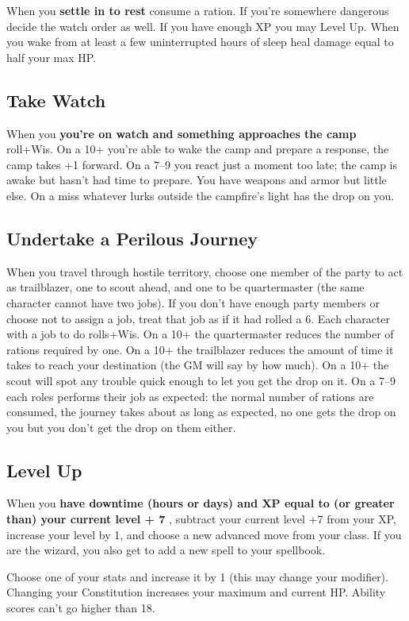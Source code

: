  When you \textbf{settle in to rest}
 consume a ration. If you're somewhere dangerous decide the watch order as well. If you have enough XP you may Level Up. When you wake from at least a few uninterrupted hours of sleep heal damage equal to half your max HP.
\subsection{Take Watch}


 When you \textbf{you're on watch and something approaches the camp}
 roll+Wis. On a 10+ you're able to wake the camp and prepare a response, the camp takes +1 forward. On a 7--9 you react just a moment too late; the camp is awake but hasn't had time to prepare. You have weapons and armor but little else. On a miss whatever lurks outside the campfire's light has the drop on you.
\subsection{Undertake a Perilous Journey}


 When you travel through hostile territory, choose one member of the party to act as trailblazer, one to scout ahead, and one to be quartermaster (the same character cannot have two jobs). If you don't have enough party members or choose not to assign a job, treat that job as if it had rolled a 6. Each character with a job to do rolls+Wis. On a 10+ the quartermaster reduces the number of rations required by one. On a 10+ the trailblazer reduces the amount of time it takes to reach your destination (the GM will say by how much). On a 10+ the scout will spot any trouble quick enough to let you get the drop on it. On a 7--9 each roles performs their job as expected: the normal number of rations are consumed, the journey takes about as long as expected, no one gets the drop on you but you don't get the drop on them either.
\subsection{Level Up}


 When you \textbf{have downtime (hours or days) and XP equal to (or greater than) your current level + 7}
, subtract your current level +7 from your XP, increase your level by 1, and choose a new advanced move from your class. If you are the wizard, you also get to add a new spell to your spellbook.


 Choose one of your stats and increase it by 1 (this may change your modifier). Changing your Constitution increases your maximum and current HP. Ability scores can't go higher than 18.
